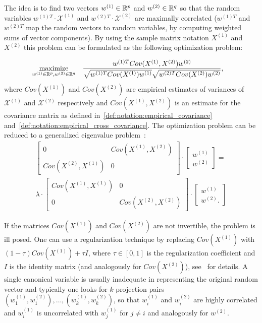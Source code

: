 The idea is to find two vectors $w^{(1)} \in \mathbb{R}^p$ and $w^{(2)} \in \mathbb{R}^q$ so that the random variables
$w^{(1)T} \cdot \mathcal{X}^{(1)}$ and $w^{(2)T} \cdot \mathcal{X}^{(2)}$ are maximally correlated
($w^{(1)T}$ and $w^{(2)T}$ map the random vectors to random variables, by computing weighted
sums of vector components). By using the sample matrix notation $X^{(1)}$ and $X^{(2)}$ this problem can
be formulated as the following optimization problem:

\begin{equation}\label{eq:background:cca:original}
\begin{aligned}
& \underset{w^{(1)} \in \mathbb{R}^{p}, w^{(2)} \in \mathbb{R}^{q}}{\text{maximize}}
& & \frac{w^{(1)T} Cov(X^{(1)},X^{(2)}) w^{(2)}}{\sqrt{w^{(1)T} Cov(X^{(1)}) w^{(1)}} \sqrt{w^{(2)T} Cov(X^{(2)}) w^{(2)}}},
\end{aligned}
\end{equation}
where $Cov(X^{(1)})$ and $Cov(X^{(2)})$ are empirical estimates of variances of $\mathcal{X}^{(1)}$ and $\mathcal{X}^{(2)}$
respectively and $Cov(X^{(1)},X^{(2)})$ is an estimate for the covariance matrix as defined
in~\ref{def:notation:empirical_covariance} and~\ref{def:notation:empirical_cross_covariance}.
The optimization problem can be reduced to a generalized eigenvalue problem~\cite{HardoonCCA}:
\begin{align}\label{eq:background:cca:eigen}
\begin{bmatrix}
    0       & Cov(X^{(1)},X^{(2)}) \\
    Cov(X^{(2)},X^{(1)})& 0
\end{bmatrix}
\cdot
\begin{bmatrix}
    w^{(1)} \\
    w^{(2)}
\end{bmatrix}
=\\
\lambda
\cdot
\begin{bmatrix}
    Cov(X^{(1)},X^{(1)}) & 0 \\
    0 &  Cov(X^{(2)},X^{(2)})
\end{bmatrix}
\cdot
\begin{bmatrix}
    w^{(1)} \\
    w^{(2)}.
\end{bmatrix}
\end{align}

If the matrices $Cov(X^{(1)})$ and $Cov(X^{(2)})$ are not invertible, the problem is ill posed.
One can use a regularization technique by replacing $Cov(X^{(1)})$ with $(1- \tau)Cov(X^{(1)}) + \tau I$,
where $\tau \in [0,1]$ is the regularization coefficient and $I$ is the identity matrix (and analogously for $Cov(X^{(2)})$),
see~\cite{shawe-taylor04kernel} for details.
A single canonical variable is usually inadequate in representing the original random vector and typically one
looks for $k$ projection pairs $(w^{(1)}_1, w^{(2)}_1),\ldots,(w^{(1)}_k, w^{(2)}_k)$, so that $w^{(1)}_i$ and $w^{(2)}_i$ are
highly correlated and $w^{(1)}_i$ is uncorrelated with $w^{(1)}_j$  for $j \neq i$ and analogously for $w^{(2)}$.

